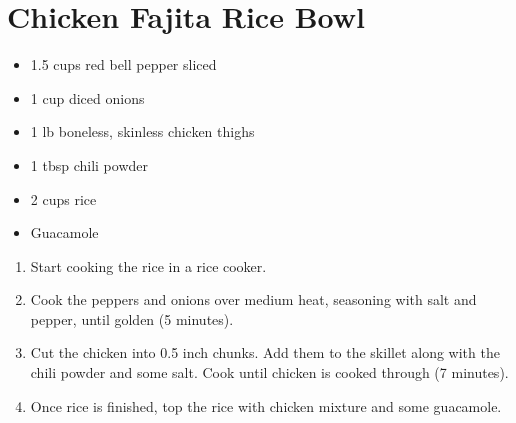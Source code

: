 \section{Chicken Fajita Rice Bowl}

\begin{itemize}
\item 1.5 cups red bell pepper sliced
\item 1 cup diced onions
\item 1 lb boneless, skinless chicken thighs
\item 1 tbsp chili powder
\item 2 cups rice
\item Guacamole
\end{itemize}

\begin{enumerate}
\item Start cooking the rice in a rice cooker.
\item Cook the peppers and onions over medium heat, seasoning with salt and pepper, until golden (5 minutes).
\item Cut the chicken into 0.5 inch chunks. Add them to the skillet along with the chili powder and some salt. Cook
    until chicken is cooked through (7 minutes).
\item Once rice is finished, top the rice with chicken mixture and some guacamole.
\end{enumerate}
